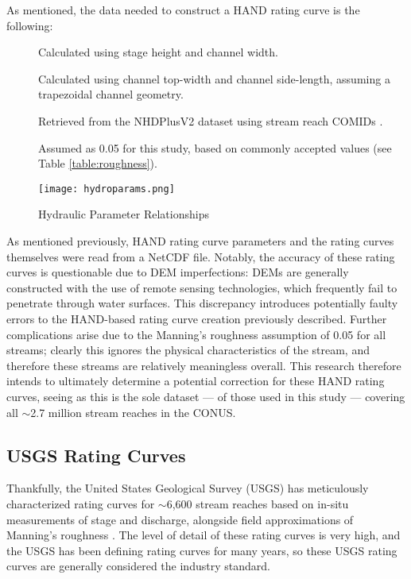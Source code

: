 \documentclass[12pt]{article}
\begin{document}
As mentioned, the data needed to construct a HAND rating curve is the following: 

\begin{description}
  \item[] Calculated using stage height and channel width.
  \item[] Calculated using channel top-width and channel side-length, assuming a trapezoidal channel geometry. 
  \item[] Retrieved from the NHDPlusV2 dataset using stream reach COMIDs \cite{nhdplusv2}.
  \item[] Assumed as 0.05 for this study, based on commonly accepted values (see Table \ref{table:roughness}).
\end{description}

\begin{figure}[b]
  \centering
  \texttt{[image: hydroparams.png]}
  \caption{Hydraulic Parameter Relationships \cite{nfiehand}}\label{fig:nfiehand}
\end{figure}

As mentioned previously, HAND rating curve parameters and the rating curves themselves were read from a NetCDF file. Notably, the accuracy of these rating curves is questionable due to DEM imperfections: DEMs are generally constructed with the use of remote sensing technologies, which frequently fail to penetrate through water surfaces. This discrepancy introduces potentially faulty errors to the HAND-based rating curve creation previously described. Further complications arise due to the Manning's roughness assumption of 0.05 for all streams; clearly this ignores the physical characteristics of the stream, and therefore these streams are relatively meaningless overall. This research therefore intends to ultimately determine a potential correction for these HAND rating curves, seeing as this is the sole dataset --- of those used in this study --- covering all $\sim$2.7 million stream reaches in the CONUS. 

\subsection*{USGS Rating Curves}

Thankfully, the United States Geological Survey (USGS) has meticulously characterized rating curves for $\sim$6,600 stream reaches based on in-situ measurements of stage and discharge, alongside field approximations of Manning's roughness \cite{usgswaterwatch}. The level of detail of these rating curves is very high, and the USGS has been defining rating curves for many years, so these USGS rating curves are generally considered the industry standard. 
\end{document}

